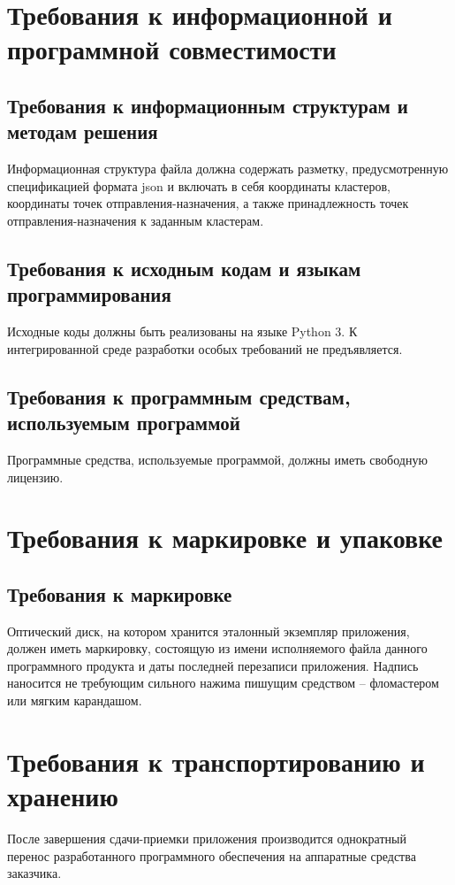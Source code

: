 \section{Требования к информационной и программной совместимости}
\subsection{Требования к информационным структурам и методам решения}
Информационная структура файла должна содержать разметку, предусмотренную спецификацией формата json и 
включать в себя координаты кластеров, координаты точек отправления-назначения, а также принадлежность точек 
отправления-назначения к заданным кластерам.

\subsection{Требования к исходным кодам и языкам программирования}
Исходные коды должны быть реализованы на языке Python 3. К интегрированной среде разработки особых требований 
не предъявляется.

\subsection{Требования к программным средствам, используемым программой}
Программные средства, используемые программой, должны иметь свободную лицензию.

\section{Требования к маркировке и упаковке}
\subsection{Требования к маркировке}
Оптический диск, на котором хранится эталонный экземпляр приложения, должен иметь маркировку, состоящую из имени 
исполняемого файла данного программного продукта и даты последней перезаписи приложения. Надпись наносится не 
требующим сильного нажима пишущим средством -- фломастером или мягким карандашом.

\section{Требования к транспортированию и хранению}
После завершения сдачи-приемки приложения производится однократный перенос разработанного программного обеспечения на 
аппаратные средства заказчика.

